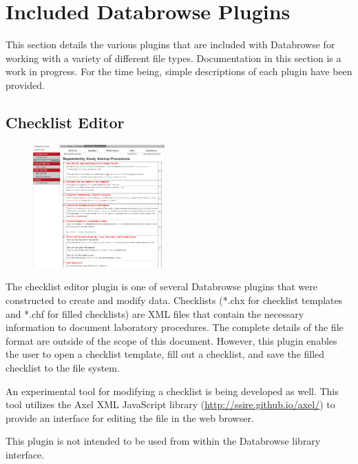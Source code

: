 \documentclass[10pt]{article}
\begin{document}
\clearpage
\section{Included Databrowse Plugins}

This section details the various plugins that are included with Databrowse for working with a variety of different file types.  Documentation in this section is a work in progress.  For the time being, simple descriptions of each plugin have been provided.

\begingroup
\setlength\intextsep{0pt}
\subsection{Checklist Editor}
\begin{figure}
		\includegraphics[width=0.45\textwidth]{Checklist_Editor.png}
\end{figure}
The checklist editor plugin is one of several Databrowse plugins that were constructed to create and modify data.  Checklists (*.chx for checklist templates and *.chf for filled checklists) are XML files that contain the necessary information to document laboratory procedures.  The complete details of the file format are outside of the scope of this document.  However, this plugin enables the user to open a checklist template, fill out a checklist, and save the filled checklist to the file system.

An experimental tool for modifying a checklist is being developed as well.  This tool utilizes the Axel XML JavaScript library (\url{http://ssire.github.io/axel/}) to provide an interface for editing the file in the web browser.

This plugin is not intended to be used from within the Databrowse library interface.

\endgroup

\hfill\break

\begingroup
\setlength\intextsep{0pt}
\end{document}
